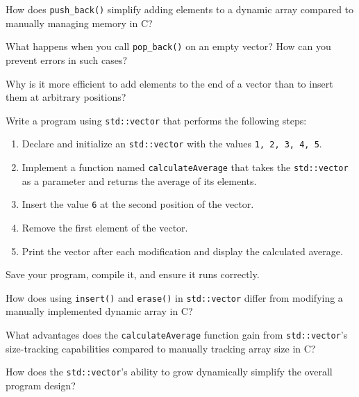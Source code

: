 \begin{challenge}
\begin{task}
        \begin{questions}
            \item How does \texttt{push_back()} simplify adding elements to a dynamic array compared to manually managing memory in C?
            \item What happens when you call \texttt{pop_back()} on an empty vector? How can you prevent errors in such cases?
            \item Why is it more efficient to add elements to the end of a vector than to insert them at arbitrary positions?
        \end{questions}
    \end{task}

    \begin{task}
        Write a program using \texttt{std::vector} that performs the following steps:
        \begin{enumerate}
            \item Declare and initialize an \texttt{std::vector} with the values \texttt{1, 2, 3, 4, 5}.
            \item Implement a function named \texttt{calculateAverage} that takes the \texttt{std::vector} as a parameter and returns the average of its elements.
            \item Insert the value \texttt{6} at the second position of the vector.
            \item Remove the first element of the vector.
            \item Print the vector after each modification and display the calculated average.
        \end{enumerate}

        Save your program, compile it, and ensure it runs correctly.

        \begin{questions}
            \item How does using \texttt{insert()} and \texttt{erase()} in \texttt{std::vector} differ from modifying a manually implemented dynamic array in C?
            \item What advantages does the \texttt{calculateAverage} function gain from \texttt{std::vector}'s size-tracking capabilities compared to manually tracking array size in C?
            \item How does the \texttt{std::vector}'s ability to grow dynamically simplify the overall program design?
        \end{questions}
    \end{task}


\end{challenge}
